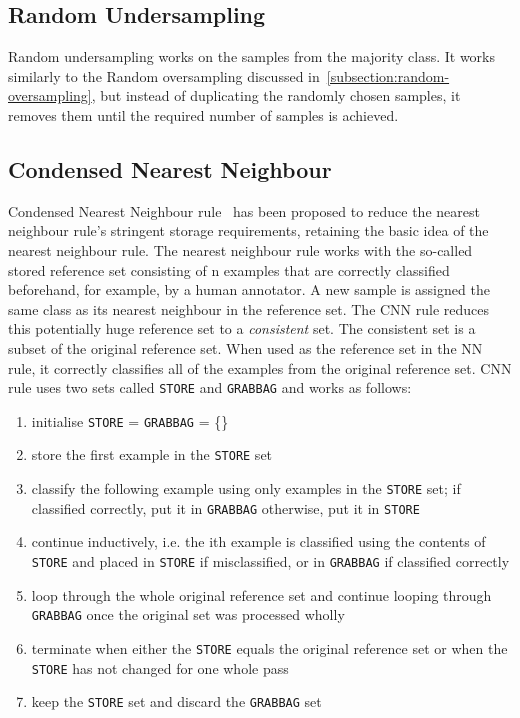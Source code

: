 \subsection{Random Undersampling}
\label{subsection:random-undersampling}

Random undersampling works on the samples from the majority class. It works similarly to the Random
oversampling discussed in~\ref{subsection:random-oversampling}, but instead of duplicating the
randomly chosen samples, it removes them until the required number of samples is achieved.


\subsection{Condensed Nearest Neighbour}
\label{subsection:cnn}

Condensed Nearest Neighbour rule~\cite{cnn} has been proposed to reduce the nearest neighbour
rule's stringent storage requirements, retaining the basic idea of the nearest neighbour rule. The
nearest neighbour rule works with the so-called stored reference set consisting of n examples that
are correctly classified beforehand, for example, by a human annotator. A new sample is assigned
the same class as its nearest neighbour in the reference set. The CNN rule reduces this potentially
huge reference set to a \textit{consistent} set. The consistent set is a subset of the original
reference set. When used as the reference set in the NN rule, it correctly classifies all of the
examples from the original reference set. CNN rule uses two sets called \texttt{STORE} and
\texttt{GRABBAG} and works as follows:

\begin{enumerate}
    \item initialise \texttt{STORE} = \texttt{GRABBAG} = \{\}
    \item store the first example in the \texttt{STORE} set
    \item classify the following example using only examples in the \texttt{STORE} set; if
        classified correctly, put it in \texttt{\texttt{GRABBAG}} otherwise, put it in
        \texttt{STORE}
    \item continue inductively, i.e. the ith example is classified using the contents of
        \texttt{STORE} and placed in \texttt{STORE} if misclassified, or in \texttt{GRABBAG} if
        classified correctly
    \item loop through the whole original reference set and continue looping through
        \texttt{GRABBAG} once the original set was processed wholly
    \item terminate when either the \texttt{STORE} equals the original reference set or when the
        \texttt{STORE} has not changed for one whole pass
    \item keep the \texttt{STORE} set and discard the \texttt{GRABBAG} set
\end{enumerate}

